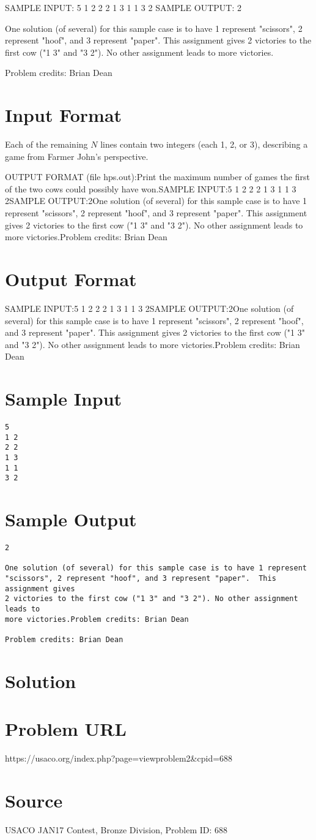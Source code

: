 \documentclass[12pt]{article}
\begin{document}
SAMPLE INPUT:
5
1 2
2 2
1 3
1 1
3 2
SAMPLE OUTPUT: 
2

One solution (of several) for this sample case is to have 1 represent
"scissors", 2 represent "hoof", and 3 represent "paper".  This assignment gives
2 victories to the first cow ("1 3" and "3 2"). No other assignment leads to
more victories.

Problem credits: Brian Dean



\section*{Input Format}
Each of the remaining $N$ lines contain two integers (each 1, 2, or 3),
describing a game from Farmer John's perspective.

OUTPUT FORMAT (file hps.out):Print the maximum number of games the first of the two cows could possibly have
won.SAMPLE INPUT:5
1 2
2 2
1 3
1 1
3 2SAMPLE OUTPUT:2One solution (of several) for this sample case is to have 1 represent
"scissors", 2 represent "hoof", and 3 represent "paper".  This assignment gives
2 victories to the first cow ("1 3" and "3 2"). No other assignment leads to
more victories.Problem credits: Brian Dean

\section*{Output Format}
SAMPLE INPUT:5
1 2
2 2
1 3
1 1
3 2SAMPLE OUTPUT:2One solution (of several) for this sample case is to have 1 represent
"scissors", 2 represent "hoof", and 3 represent "paper".  This assignment gives
2 victories to the first cow ("1 3" and "3 2"). No other assignment leads to
more victories.Problem credits: Brian Dean

\section*{Sample Input}
\begin{verbatim}
5
1 2
2 2
1 3
1 1
3 2
\end{verbatim}

\section*{Sample Output}
\begin{verbatim}
2

One solution (of several) for this sample case is to have 1 represent
"scissors", 2 represent "hoof", and 3 represent "paper".  This assignment gives
2 victories to the first cow ("1 3" and "3 2"). No other assignment leads to
more victories.Problem credits: Brian Dean

Problem credits: Brian Dean
\end{verbatim}

\section*{Solution}


\section*{Problem URL}
https://usaco.org/index.php?page=viewproblem2&cpid=688

\section*{Source}
USACO JAN17 Contest, Bronze Division, Problem ID: 688
\end{document}
